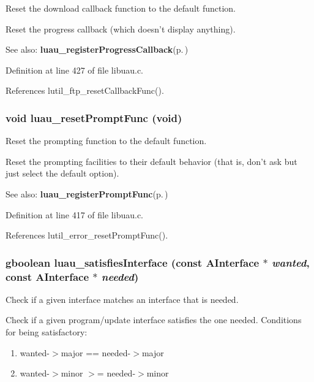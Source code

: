 Reset the download callback function to the default function. 

Reset the progress callback (which doesn't display anything).

\begin{Desc}
\item[See also:]{\bf luau\_\-register\-Progress\-Callback}{\rm (p.\,\pageref{libuau_8h_a59})} \end{Desc}


Definition at line 427 of file libuau.c.

References lutil\_\-ftp\_\-reset\-Callback\-Func().
\subsubsection{\setlength{\rightskip}{0pt plus 5cm}void luau\_\-reset\-Prompt\-Func (void)}\label{libuau_8c_a15}


Reset the prompting function to the default function. 

Reset the prompting facilities to their default behavior (that is, don't ask but just select the default option).

\begin{Desc}
\item[See also:]{\bf luau\_\-register\-Prompt\-Func}{\rm (p.\,\pageref{libuau_8h_a58})} \end{Desc}


Definition at line 417 of file libuau.c.

References lutil\_\-error\_\-reset\-Prompt\-Func().
\subsubsection{\setlength{\rightskip}{0pt plus 5cm}gboolean luau\_\-satisfies\-Interface (const {\bf AInterface} $\ast$ {\em wanted}, const {\bf AInterface} $\ast$ {\em needed})}\label{libuau_8c_a38}


Check if a given interface matches an interface that is needed. 

Check if a given program/update interface satisfies the one needed. Conditions for being satisfactory: \begin{enumerate}
\item wanted-$>$major == needed-$>$major \item wanted-$>$minor $>$= needed-$>$minor \end{enumerate}


